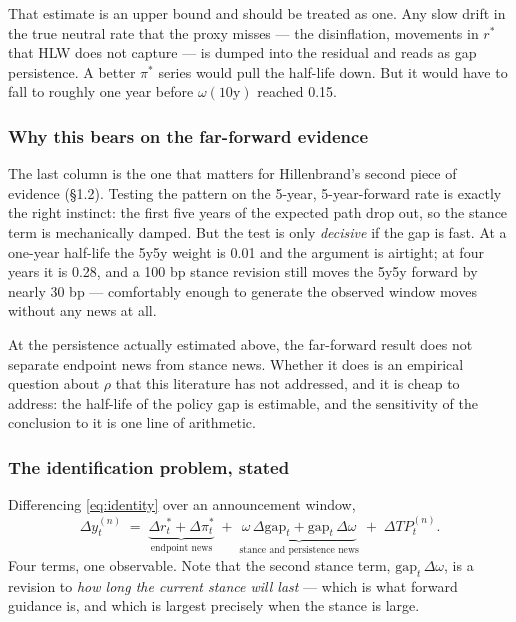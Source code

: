 That estimate is an upper bound and should be treated as one. Any slow drift in the true
neutral rate that the proxy misses --- the disinflation, movements in $r^{*}$ that HLW does not
capture --- is dumped into the residual and reads as gap persistence. A better $\pi^{*}$ series
would pull the half-life down. But it would have to fall to roughly one year before
$\omega(10\text{y})$ reached 0.15.

\subsubsection*{Why this bears on the far-forward evidence}

The last column is the one that matters for Hillenbrand's second piece of evidence
(\S1.2). Testing the pattern on the 5-year, 5-year-forward rate is exactly the right
instinct: the first five years of the expected path drop out, so the stance term is
mechanically damped. But the test is only \emph{decisive} if the gap is fast. At a one-year
half-life the 5y5y weight is 0.01 and the argument is airtight; at four years it is 0.28,
and a 100 bp stance revision still moves the 5y5y forward by nearly 30 bp --- comfortably
enough to generate the observed window moves without any \rs{} news at all.

At the persistence actually estimated above, the far-forward result does not separate
endpoint news from stance news. Whether it does is an empirical question about $\rho$ that
this literature has not addressed, and it is cheap to address: the half-life of the policy
gap is estimable, and the sensitivity of the conclusion to it is one line of arithmetic.

\subsubsection*{The identification problem, stated}

Differencing \eqref{eq:identity} over an announcement window,
\begin{equation}
\Delta y^{(n)}_t \;=\; \underbrace{\Delta r^{*}_t + \Delta \pi^{*}_t}_{\text{endpoint news}}
\;+\; \underbrace{\omega\,\Delta\text{gap}_t + \text{gap}_t\,\Delta\omega}_{\text{stance and persistence news}}
\;+\; \Delta TP^{(n)}_t .
\label{eq:windowdiff}
\end{equation}
Four terms, one observable. Note that the second stance term, $\text{gap}_t\,\Delta\omega$, is a
revision to \emph{how long the current stance will last} --- which is what forward guidance is,
and which is largest precisely when the stance is large.

